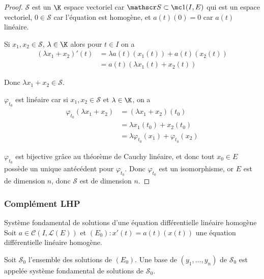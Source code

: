 \begin{proof}
    $\mathscr S$ est un $\K$ espace vectoriel car $\mathscr S \subset \mc 1(I, E)$ 
    qui est un espace vectoriel, $0 \in \mathscr S$ car l'équation est homogène, et $a(t)(0) = 0$ car 
    $a(t)$ linéaire. 

    Si $x_1, x_2 \in \mathscr S$, $\lambda \in \K$ alors pour $t \in I$ on a 
    \begin{align}
        (\lambda x_1 + x_2)'(t) & = \lambda a(t)(x_1(t)) + a(t)(x_2(t)) \\
        & = a(t)(\lambda x_1(t) + x_2(t))
    \end{align}

    Donc $\lambda x_1 + x_2 \in \mathscr S$.

    $\varphi_{t_0}$ est linéaire car si $x_1, x_2 \in \mathscr S$ et $\lambda \in \K$, on a 
    \begin{align}
        \varphi_{t_0}(\lambda x_1 + x_2) & = (\lambda x_1 + x_2)(t_0) \\
        & = \lambda x_1(t_0) + x_2(t_0) \\
        & = \lambda \varphi_{t_0}(x_1) + \varphi_{t_0}(x_2)
    \end{align}

    $\varphi_{t_0}$ est bijective grâce au théorème de Cauchy linéaire, et donc tout $x_0 \in E$
    possède un unique antécédent pour $\varphi_{t_0}$. Donc $\varphi_{t_0}$ est un isomorphisme, or 
    $E$ est de dimension $n$, donc $\mathscr S$ est de dimension $n$.
\end{proof}

\subsubsection{Complément LHP}

\begin{definitionnt}{Système fondamental de solutions d'une équation différentielle linéaire homogène}{}
    Soit $a \in \mathscr C(I, \mathscr L(E))$ et 
    $(E_0) : x'(t) = a(t)(x(t))$ une équation différentielle linéaire homogène.

    Soit $\mathscr S_0$ l'ensemble des solutions de $(E_0)$. Une base de 
    $(y_1, \dots, y_n)$ de $\mathscr S_0$ est appelée système fondamental de solutions de $\mathscr S_0$.
\end{definitionnt}

